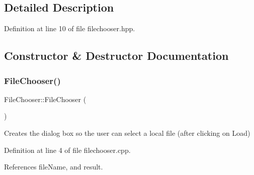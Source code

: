 \subsection{Detailed Description}


Definition at line 10 of file filechooser.\+hpp.



\subsection{Constructor \& Destructor Documentation}
\mbox{\label{class_file_chooser_a566dad72c6724bc2d4970361758d66c5}} 
\subsubsection{\texorpdfstring{File\+Chooser()}{FileChooser()}}
{\footnotesize\ttfamily File\+Chooser\+::\+File\+Chooser (\begin{DoxyParamCaption}{ }\end{DoxyParamCaption})}



Creates the dialog box so the user can select a local file (after clicking on \textquotesingle{}Load\textquotesingle{}) 



Definition at line 4 of file filechooser.\+cpp.



References file\+Name, and result.


